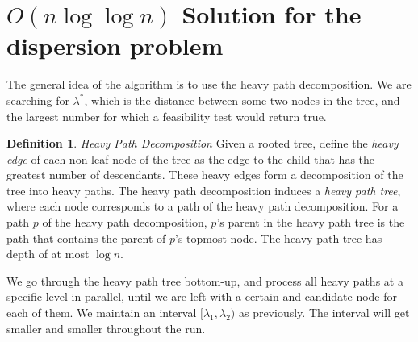 \documentclass[11pt,a4paper]{article}
\theoremstyle{definition}
\newtheorem{definition}{Definition}
\theoremstyle{remark}
\begin{document}
\section{$O(n\log\log n)$ Solution for the dispersion problem} \label{nloglogn solution}
The general idea of the algorithm is to use the heavy path decomposition. We are searching for $\lambda^*$, which is the distance between some two nodes in the tree, and the largest number for which a feasibility test would return true.
\begin{definition}
\emph{Heavy Path Decomposition} \cite{Sleator1983} Given a rooted tree, define the \emph{heavy edge} of each non-leaf node of the tree as the edge to the child that has the greatest number of descendants. These heavy edges form a decomposition of the tree into heavy paths. The heavy path decomposition induces a \emph{heavy path tree}, where each node corresponds to a path of the heavy path decomposition. For a path $p$ of the heavy path decomposition, $p$'s parent in the heavy path tree is the path that contains the parent of $p$'s topmost node. The heavy path tree has depth of at most $\log n$. %
\end{definition}
We go through the heavy path tree bottom-up, and process all heavy paths at a specific level in parallel, until we are left with a certain and candidate node for each of them. We maintain an interval $[\lambda_1,\lambda_2)$ as previously. The interval will get smaller and smaller throughout the run.
\end{document}
